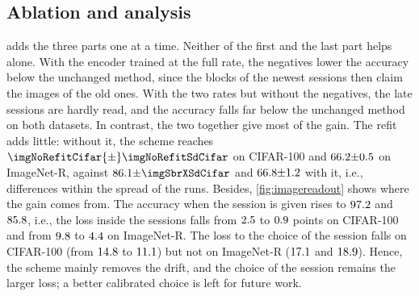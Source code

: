 \subsection{Ablation and analysis}
\label{app:imgabl}

\begin{table}[t]
\centering\small
\setlength{\tabcolsep}{4pt}
\caption{\textbf{Ablation of session-exclusive training} (mean $\pm$ s.d.\ of three runs; rows~II and~III: one run; row~I: CoLaR-SBR unchanged). $^{u}$Not reported: the late sessions are not learned, so there is nothing to forget.}
\label{tab:imageabl}
\resizebox{\linewidth}{!}{}
\end{table}

  adds the three parts one at a time. Neither of the first and the last part helps alone. With the encoder trained at the full rate, the negatives lower the accuracy below the unchanged method, since the blocks of the newest sessions then claim the images of the old ones. With the two rates but without the negatives, the late sessions are hardly read, and the accuracy falls far below the unchanged method on both datasets. In contrast, the two together give most of the gain. The refit adds little: without it, the scheme reaches $\imgNoRefitCifar{\pm}\imgNoRefitSdCifar$ on CIFAR-100 and $66.2{\pm}0.5$ on ImageNet-R, against $\imgSbrXCifar{\pm}\imgSbrXSdCifar$ and $66.8{\pm}1.2$ with it, i.e., differences within the spread of the runs. Besides, \cref{fig:imagereadout} shows where the gain comes from. The accuracy when the session is given rises to $97.2$ and $85.8$, i.e., the loss inside the sessions falls from $2.5$ to $0.9$ points on CIFAR-100 and from $9.8$ to $4.4$ on ImageNet-R. The loss to the choice of the session falls on CIFAR-100 (from $14.8$ to $11.1$) but not on ImageNet-R ($17.1$ and $18.9$). Hence, the scheme mainly removes the drift, and the choice of the session remains the larger loss; a better calibrated choice is left for future work.
